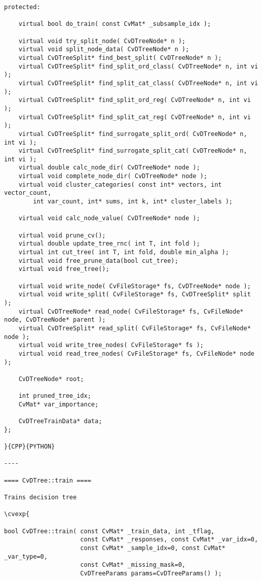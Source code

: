 \begin{verbatim}
protected:

    virtual bool do_train( const CvMat* _subsample_idx );

    virtual void try_split_node( CvDTreeNode* n );
    virtual void split_node_data( CvDTreeNode* n );
    virtual CvDTreeSplit* find_best_split( CvDTreeNode* n );
    virtual CvDTreeSplit* find_split_ord_class( CvDTreeNode* n, int vi );
    virtual CvDTreeSplit* find_split_cat_class( CvDTreeNode* n, int vi );
    virtual CvDTreeSplit* find_split_ord_reg( CvDTreeNode* n, int vi );
    virtual CvDTreeSplit* find_split_cat_reg( CvDTreeNode* n, int vi );
    virtual CvDTreeSplit* find_surrogate_split_ord( CvDTreeNode* n, int vi );
    virtual CvDTreeSplit* find_surrogate_split_cat( CvDTreeNode* n, int vi );
    virtual double calc_node_dir( CvDTreeNode* node );
    virtual void complete_node_dir( CvDTreeNode* node );
    virtual void cluster_categories( const int* vectors, int vector_count,
        int var_count, int* sums, int k, int* cluster_labels );

    virtual void calc_node_value( CvDTreeNode* node );

    virtual void prune_cv();
    virtual double update_tree_rnc( int T, int fold );
    virtual int cut_tree( int T, int fold, double min_alpha );
    virtual void free_prune_data(bool cut_tree);
    virtual void free_tree();

    virtual void write_node( CvFileStorage* fs, CvDTreeNode* node );
    virtual void write_split( CvFileStorage* fs, CvDTreeSplit* split );
    virtual CvDTreeNode* read_node( CvFileStorage* fs, CvFileNode* node, CvDTreeNode* parent );
    virtual CvDTreeSplit* read_split( CvFileStorage* fs, CvFileNode* node );
    virtual void write_tree_nodes( CvFileStorage* fs );
    virtual void read_tree_nodes( CvFileStorage* fs, CvFileNode* node );

    CvDTreeNode* root;

    int pruned_tree_idx;
    CvMat* var_importance;

    CvDTreeTrainData* data;
};

}{CPP}{PYTHON}

----

==== CvDTree::train ====

Trains decision tree

\cvexp{

bool CvDTree::train( const CvMat* _train_data, int _tflag,
                     const CvMat* _responses, const CvMat* _var_idx=0,
                     const CvMat* _sample_idx=0, const CvMat* _var_type=0,
                     const CvMat* _missing_mask=0,
                     CvDTreeParams params=CvDTreeParams() );


\end{verbatim}
